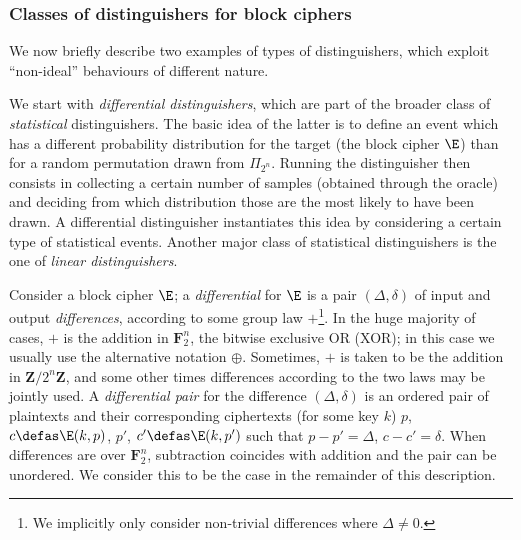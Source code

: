 \subsubsection{Classes of distinguishers for block ciphers}

We now briefly describe two examples of types of distinguishers, which exploit ``non-ideal'' behaviours of different nature.

\bigskip

We start with \emph{differential distinguishers}, which are part of the broader class of \emph{statistical} distinguishers.
The basic idea of the latter is to define an event which has a different probability distribution for the target (the block cipher $\E$)
than for a random permutation drawn from $\Pi_{2^n}$. Running the distinguisher then consists in collecting a certain number of samples (obtained through
the oracle) and deciding from which distribution
those are the
most likely to have been drawn.
A differential distinguisher instantiates this idea by considering a certain type of statistical events. Another major class of
statistical distinguishers is the one of \emph{linear distinguishers}.

Consider a block cipher $\E$; a \emph{differential} for $\E$ is a pair $(\Delta,\delta)$ of input and output \emph{differences},
according to some group law $+$\footnote{We implicitly only consider non-trivial differences where $\Delta \neq 0$.}.
In the huge majority of cases, $+$ is the addition in $\mathbf{F}_2^n$,
\ie the bitwise exclusive OR (XOR); in this case we usually use the alternative notation $\oplus$. Sometimes, $+$
is taken to be the addition in $\mathbf{Z}/2^n\mathbf{Z}$, and some other times differences according to the two laws may be jointly used.
A \emph{differential pair} for the difference $(\Delta,\delta)$ is an ordered pair of plaintexts and their corresponding ciphertexts (for some
key $k$)
$p$, $c \defas \E(k,p)$, $p'$, $c' \defas \E(k,p')$ such that $p - p' = \Delta$, $c - c' = \delta$. When differences are over $\mathbf{F}_2^n$,
subtraction coincides with addition and the pair can be unordered. We consider this to be the case in the remainder of this description.

